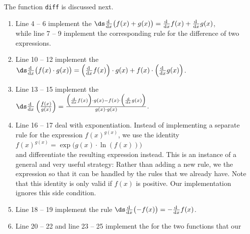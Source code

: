 \noindent
The function \texttt{diff} is discussed next.
\begin{enumerate}
\item Line 4 -- 6 implement the 
      $\ds\frac{\mathrm{d}\;}{\mathrm{d}x}\bigl(f(x) + g(x)\bigr) 
       = \frac{\mathrm{d}\;}{\mathrm{d}x} f(x) + \frac{\mathrm{d}\;}{\mathrm{d}x} g(x)$,
      \\[0.1cm]
      while line 7 -- 9 implement the corresponding rule for the difference of two expressions.
\item Line 10 -- 12 implement the 
      \\[0.2cm]
      \hspace*{1.3cm}
      $\ds\frac{\mathrm{d}\;}{\mathrm{d}x}\bigl(f(x) \cdot g(x)\bigr)
       = \Bigl(\frac{\mathrm{d}\;}{\mathrm{d}x} f(x)\Bigr) \cdot g(x)
       + f(x) \cdot \Bigl(\frac{\mathrm{d}\;}{\mathrm{d}x} g(x)\Bigr)$.
\item Line 13 -- 15 implement the 
      \\[0.2cm]
      \hspace*{1.3cm}
      $\ds\frac{\mathrm{d}\;}{\mathrm{d}x}\left(\frac{f(x)}{g(x)}\right)
       = \frac{\Bigl(\frac{\mathrm{d}}{\mathrm{d}x} f(x)\Bigr) \cdot g(x)
              - f(x) \cdot \Bigl(\frac{\mathrm{d}}{\mathrm{d}x} g(x)\Bigr)}{g(x) \cdot g(x)}$.
\item Line 16 -- 17 deal with exponentiation.  Instead of implementing a separate rule for the expression
      $f(x)^{g(x)}$, we use the identity
      \\[0.2cm]
      \hspace*{1.3cm}
      $f(x)^{g(x)} = \exp\bigl(g(x) \cdot \ln(f(x))\bigr)$
      \\[0.2cm]
      and differentiate the resulting expression instead.  This is an instance of a general and very
      useful strategy:  Rather than adding a new rule, we  the expression so that it can be
      handled by the rules that we already have.  Note that this identity is only valid if $f(x)$ is
      positive.  Our implementation ignores this side condition.
\item Line 18 -- 19 implement the rule
      $\ds\frac{\mathrm{d}\;}{\mathrm{d}x}\bigl(-f(x)\bigr) 
       = -\frac{\mathrm{d}\;}{\mathrm{d}x} f(x)$.
\item Line 20 -- 22 and line 23 -- 25 implement the  for the two functions that our

\end{enumerate}
